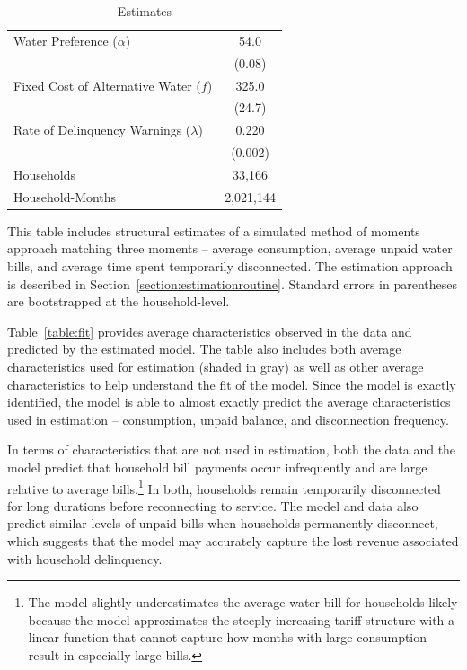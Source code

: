 \documentclass[12pt]{article}
\begin{document}
\begin{table}[h!]
\centering
\caption{Estimates}\label{table:estimates}
\begin{threeparttable}
\begin{tabular}{@{}l*{1}{c}@{}}
\toprule
Water Preference  ($\alpha$) & 54.0 \\
 &   (0.08\unskip) \\[.4em]
Fixed Cost of Alternative Water ($f$) &  325.0 \\
 &    (24.7\unskip) \\[.4em]
Rate of Delinquency Warnings ($\lambda$) &  0.220 \\
 &   (0.002\unskip) \\[.8em]
Households &  33,166 \\
Household-Months &  2,021,144 \\
\bottomrule
\end{tabular}
\begin{tablenotes}
\item 
\footnotesize
This table includes structural estimates of a simulated method of moments approach matching three moments -- average consumption, average unpaid water bills, and average time spent temporarily disconnected.  The estimation approach is described in Section~\ref{section:estimationroutine}.  Standard errors in parentheses are bootstrapped at the household-level. 
\end{tablenotes}
\end{threeparttable}
\end{table}

Table~\ref{table:fit} provides average characteristics observed in the data and predicted by the estimated model.  The table also includes both average characteristics used for estimation (shaded in gray) as well as other average characteristics to help understand the fit of the model.  Since the model is exactly identified, the model is able to almost exactly predict the average characteristics used in estimation -- consumption, unpaid balance, and disconnection frequency.

In terms of characteristics that are not used in estimation, both the data and the model predict that household bill payments occur infrequently and are large relative to average bills.\footnote{The model slightly underestimates the average water bill for households likely because the model approximates the steeply increasing tariff structure with a linear function that cannot capture how months with large consumption result in especially large bills.}  In both, households remain temporarily disconnected for long durations before reconnecting to service.  The model and data also predict similar levels of unpaid bills when households permanently disconnect, which suggests that the model may accurately capture the lost revenue associated with household delinquency.
\end{document}
